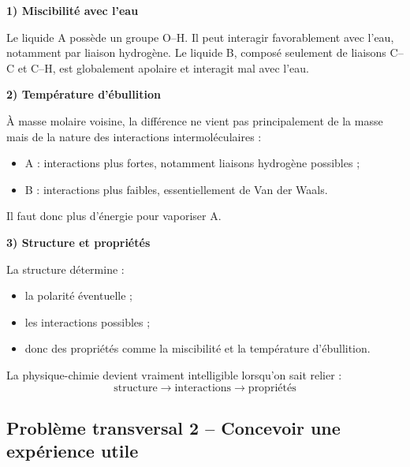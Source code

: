 \documentclass[11pt,a4paper]{article}
\begin{document}
\begin{corrigebox}
\textbf{1) Miscibilité avec l'eau}

Le liquide A possède un groupe O--H.  
Il peut interagir favorablement avec l'eau, notamment par liaison hydrogène.  
Le liquide B, composé seulement de liaisons C--C et C--H, est globalement apolaire et interagit mal avec l'eau.

\textbf{2) Température d'ébullition}

À masse molaire voisine, la différence ne vient pas principalement de la masse mais de la nature des interactions intermoléculaires :
\begin{itemize}
    \item A : interactions plus fortes, notamment liaisons hydrogène possibles ;
    \item B : interactions plus faibles, essentiellement de Van der Waals.
\end{itemize}
Il faut donc plus d'énergie pour vaporiser A.

\textbf{3) Structure et propriétés}

La structure détermine :
\begin{itemize}
    \item la polarité éventuelle ;
    \item les interactions possibles ;
    \item donc des propriétés comme la miscibilité et la température d'ébullition.
\end{itemize}

\begin{bilanbox}
La physique-chimie devient vraiment intelligible lorsqu'on sait relier :
\[
\text{structure} \rightarrow \text{interactions} \rightarrow \text{propriétés}
\]
\end{bilanbox}
\end{corrigebox}

\subsection{Problème transversal 2 -- Concevoir une expérience utile}
\end{document}
